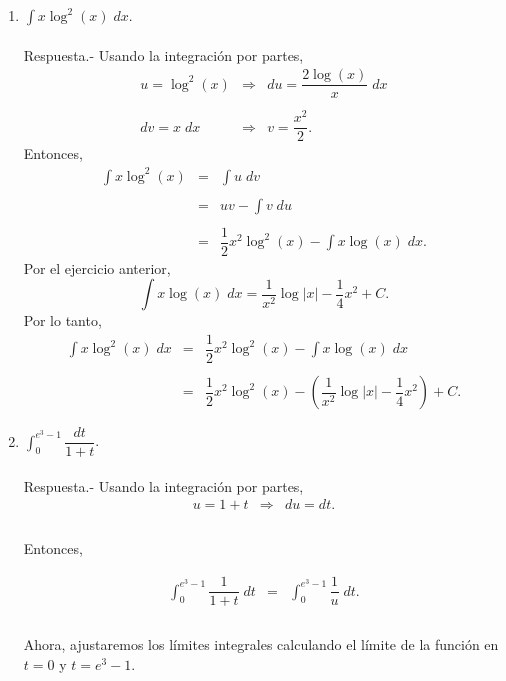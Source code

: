 \begin{enumerate}[\bfseries 1.]
    \item $\displaystyle\int x\log^2(x)\; dx$.\\\\
	Respuesta.-\; Usando la integración por partes,
	$$
	\begin{array}{rcl}
	    u=\log^2(x) &\Rightarrow& du=\dfrac{2\log(x)}{x}\; dx\\\\
	    dv=x\; dx &\Rightarrow& v=\dfrac{x^2}{2}.
	\end{array}
	$$
	Entonces,
	$$
	\begin{array}{rcl}
	    \displaystyle\int x\log^2(x) &=& \displaystyle\int u \; dv\\\\
					 &=& uv-\displaystyle\int v\; du\\\\
					 &=& \dfrac{1}{2}x^2\log^2(x)-\displaystyle\int x\log(x)\; dx.
	\end{array}
	$$
	Por el ejercicio anterior,
	$$\displaystyle\int x\log(x)\; dx = \dfrac{1}{x^2}\log|x|-\dfrac{1}{4}x^2+C.$$
	Por lo tanto,
	$$
	\begin{array}{rcl}
	    \displaystyle\int x\log^2(x)\; dx &=&  \dfrac{1}{2}x^2\log^2(x)-\displaystyle\int x\log(x)\; dx\\\\
					      &=& \dfrac{1}{2}x^2\log^2(x)-\left(\dfrac{1}{x^2}\log|x|-\dfrac{1}{4}x^2\right)+C.
	\end{array}
	$$
	\vspace{.5cm}


    \item $\displaystyle\int_0^{e^3-1} \dfrac{dt}{1+t}$.\\\\
	Respuesta.-\; Usando la integración por partes,
	$$
	\begin{array}{rcl}
	    u=1+t &\Rightarrow& du=dt.\\\\
	\end{array}
	$$

	Entonces,

	$$
	\begin{array}{rcl}
	    \displaystyle\int_0^{e^3-1}\dfrac{1}{1+t}\; dt&=&\displaystyle\int_0^{e^3-1}\dfrac{1}{u}\; dt.\\\\
	\end{array}
	$$

	Ahora, ajustaremos los límites integrales calculando el límite de la función en $t=0$ y $t=e^3-1$.


\end{enumerate}
